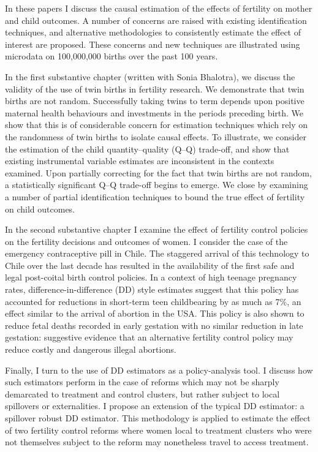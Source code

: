 In these papers I discuss the causal estimation of the effects of fertility on 
mother and child outcomes.  A number of concerns are raised with existing 
identification techniques, and alternative methodologies to consistently 
estimate the effect of interest are proposed.  These concerns and new techniques 
are illustrated using microdata on 100,000,000 births over the past 100 years.

In the first substantive chapter (written with Sonia Bhalotra), we discuss the 
validity of the use of twin births in fertility research.  We demonstrate that 
twin births are not random.  Successfully taking twins to term depends upon 
positive maternal health behaviours and investments in the periods preceding 
birth. We show that this is of considerable concern for estimation techniques 
which rely on the randomness of twin births to isolate causal effects.  To 
illustrate, we consider the estimation of the child quantity--quality (Q--Q) 
trade-off, and show that existing instrumental variable estimates are 
inconsistent in the contexts examined. Upon partially correcting for the fact 
that twin births are not random, a statistically significant Q--Q trade-off 
begins to emerge.  We close by examining a number of partial identification 
techniques to bound the true effect of fertility on child outcomes.

In the second substantive chapter I examine the effect of fertility control 
policies on the fertility decisions and outcomes of women.  I consider the case 
of the emergency contraceptive pill in Chile.  The staggered arrival of this
technology to Chile over the last decade has resulted in the availability of the 
first safe and legal post-coital birth control policies.  In a context of high
teenage pregnancy rates, difference-in-difference (DD) style estimates suggest 
that this policy has accounted for reductions in short-term teen childbearing 
by as much as 7\%, an effect similar to the arrival of abortion in the USA.  
This policy is also shown to reduce fetal deaths recorded in early gestation 
with no similar reduction in late gestation: suggestive evidence that an
alternative fertility control policy may reduce costly and dangerous illegal 
abortions.

Finally, I turn to the use of DD estimators as a policy-analysis tool.  I discuss
how such estimators perform in the case of reforms which may not be sharply 
demarcated to treatment and control clusters, but rather subject to local 
spillovers or externalities.  I propose an extension of the typical DD estimator: 
a spillover robust DD estimator.  This methodology is applied to estimate the 
effect of two fertility control reforms where women local to treatment clusters 
who were not themselves subject to the reform may nonetheless travel to access 
treatment. 

